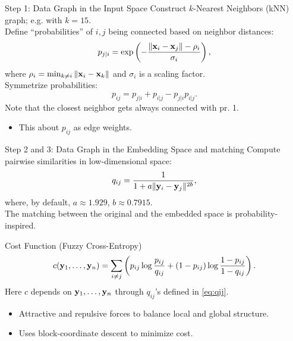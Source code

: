\documentclass[11pt,handout,aspectratio=169]{beamer}
\begin{document}
\begin{frame}{Step 1: Data Graph in the Input Space}
Construct $k$-Nearest Neighbors (kNN) graph; e.g.  with $k=15$.\\[3mm]
Define ``probabilities'' of $i,j$ being connected based on neighbor distances:
    $$p_{j|i} = \exp\left(-\frac{\|\mathbf{x}_i - \mathbf{x}_j\| - \rho_i}{\sigma_i}\right),$$
    where $\rho_i=\min_{k\neq i}\|\mathbf{x}_i-\mathbf{x}_k\|$ and $\sigma_i$ is a scaling factor.\\[3mm]
Symmetrize probabilities:
    $$p_{ij} = p_{j|i} + p_{i|j} - p_{j|i}p_{i|j}.$$
    Note that the closest neighbor gets always connected with pr. 1.
    \begin{itemize}
    	\item This about $p_{ij}$ as edge weights.
    \end{itemize}
\end{frame}

\begin{frame}{Step 2 and 3: Data Graph in the Embedding Space and matching}
Compute pairwise similarities in low-dimensional space:
\begin{equation}\label{eq:qij}
	q_{ij} = \frac{1}{1 + a\|\mathbf{y}_i - \mathbf{y}_j\|^{2b}},
\end{equation}
    where, by default,  $a \approx 1.929$, $b \approx 0.7915$.\\[4mm]
The matching between the original and the embedded space is probability-inspired.
\begin{alertblock}{Cost Function (Fuzzy Cross-Entropy)}
$$c(\mathbf{y}_1,\ldots,\mathbf{y}_n) = \sum_{i \neq j} \left(p_{ij} \log \frac{p_{ij}}{q_{ij}} + (1 - p_{ij}) \log \frac{1 - p_{ij}}{1 - q_{ij}}\right).$$
Here $c$ depends on $\mathbf{y}_1,\ldots,\mathbf{y}_n$ through $q_{ij}$'s defined in \eqref{eq:qij}.
\end{alertblock}
\begin{itemize}
\item Attractive and repulsive forces to balance local and global structure.
    \item Uses block-coordinate descent to minimize cost.
\end{itemize}
\end{frame}
\end{document}
